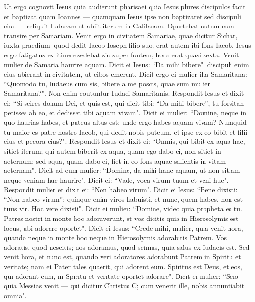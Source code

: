 \begin{biblechapter} 
\verse Ut ergo cognovit Iesus quia audierunt pharisaei quia Iesus plures discipulos facit et baptizat quam Ioannes 
\verse — quamquam Iesus ipse non baptizaret sed discipuli eius —  
\verse reliquit Iudaeam et abiit iterum in Galilaeam. 
\verse Oportebat autem eum transire per Samariam. 
\verse Venit ergo in civitatem Samariae, quae dicitur Sichar, iuxta praedium, quod dedit Iacob Ioseph filio suo; 
\verse erat autem ibi fons Iacob. Iesus ergo fatigatus ex itinere sedebat sic super fontem; hora erat quasi sexta. 
\verse Venit mulier de Samaria haurire aquam. Dicit ei Iesus: “Da mihi bibere"; 
\verse discipuli enim eius abierant in civitatem, ut cibos emerent. 
\verse Dicit ergo ei mulier illa Samaritana: “Quomodo tu, Iudaeus cum sis, bibere a me poscis, quae sum mulier Samaritana?". Non enim coutuntur Iudaei Samaritanis. 
\verse Respondit Iesus et dixit ei: “Si scires donum Dei, et quis est, qui dicit tibi: “Da mihi bibere”, tu forsitan petisses ab eo, et dedisset tibi aquam vivam". 
\verse Dicit ei mulier: “Domine, neque in quo haurias habes, et puteus altus est; unde ergo habes aquam vivam? 
\verse Numquid tu maior es patre nostro Iacob, qui dedit nobis puteum, et ipse ex eo bibit et filii eius et pecora eius?". 
\verse Respondit Iesus et dixit ei: “Omnis, qui bibit ex aqua hac, sitiet iterum;  
\verse qui autem biberit ex aqua, quam ego dabo ei, non sitiet in aeternum; sed aqua, quam dabo ei, fiet in eo fons aquae salientis in vitam aeternam". 
\verse Dicit ad eum mulier: “Domine, da mihi hanc aquam, ut non sitiam neque veniam huc haurire". 
\verse Dicit ei: “Vade, voca virum tuum et veni huc". 
\verse Respondit mulier et dixit ei: “Non habeo virum". Dicit ei Iesus: “Bene dixisti: “Non habeo virum”; 
\verse quinque enim viros habuisti, et nunc, quem habes, non est tuus vir. Hoc vere dixisti". 
\verse Dicit ei mulier: “Domine, video quia propheta es tu. 
\verse Patres nostri in monte hoc adoraverunt, et vos dicitis quia in Hierosolymis est locus, ubi adorare oportet". 
\verse Dicit ei Iesus: “Crede mihi, mulier, quia venit hora, quando neque in monte hoc neque in Hierosolymis adorabitis Patrem. 
\verse Vos adoratis, quod nescitis; nos adoramus, quod scimus, quia salus ex Iudaeis est. 
\verse Sed venit hora, et nunc est, quando veri adoratores adorabunt Patrem in Spiritu et veritate; nam et Pater tales quaerit, qui adorent eum. 
\verse Spiritus est Deus, et eos, qui adorant eum, in Spiritu et veritate oportet adorare". 
\verse Dicit ei mulier: “Scio quia Messias venit — qui dicitur Christus C; cum venerit ille, nobis annuntiabit omnia". 

\end{biblechapter}

